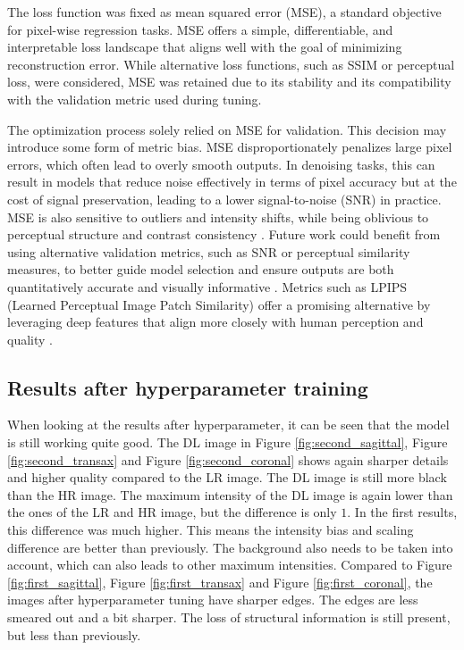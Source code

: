 \documentclass[twocolumn]{article}
\begin{document}
The loss function was fixed as mean squared error (MSE), a standard objective for pixel-wise regression tasks. 
MSE offers a simple, differentiable, and interpretable loss landscape that aligns well with the goal of minimizing reconstruction error. 
While alternative loss functions, such as SSIM or perceptual loss, were considered, MSE was retained due to its stability and its compatibility with the validation metric used during tuning. 

The optimization process solely relied on MSE for validation.   
This decision may introduce some form of metric bias. 
MSE disproportionately penalizes large pixel errors, which often lead to overly smooth outputs. 
In denoising tasks, this can result in models that reduce noise effectively in terms of pixel accuracy but at the cost of signal preservation, leading to a lower signal-to-noise (SNR) in practice. 
MSE is also sensitive to outliers and intensity shifts, while being oblivious to perceptual structure and contrast consistency \cite{1284395}. 
Future work could benefit from using alternative validation metrics, such as SNR or perceptual similarity measures, to better guide model selection and ensure outputs are both quantitatively accurate and visually informative \cite{chavhan2009t2star}. 
Metrics such as LPIPS (Learned Perceptual Image Patch Similarity) offer a promising alternative by leveraging deep features that align more closely with human perception and quality \cite{zhang2018unreasonableeffectivenessdeepfeatures}.

\subsection{Results after hyperparameter training}
When looking at the results after hyperparameter, it can be seen that the model is still working quite good. 
The DL image in Figure \ref{fig:second_sagittal}, Figure \ref{fig:second_transax} and Figure \ref{fig:second_coronal} shows again sharper details and higher quality compared to the LR image.
The DL image is still more black than the HR image.
The maximum intensity of the DL image is again lower than the ones of the LR and HR image, but the difference is only $1$. 
In the first results, this difference was much higher.
This means the intensity bias and scaling difference are better than previously.
The background also needs to be taken into account, which can also leads to other maximum intensities.
Compared to Figure \ref{fig:first_sagittal}, Figure \ref{fig:first_transax} and Figure \ref{fig:first_coronal}, the images after hyperparameter tuning have sharper edges.
The edges are less smeared out and a bit sharper.
The loss of structural information is still present, but less than previously. 
\end{document}
